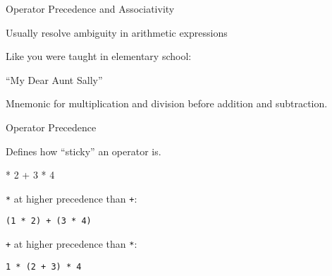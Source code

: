 \documentclass{plt}
\def\plus#1#2{node {\texttt{+}} child {#1} child {#2}}
\def\mult#1#2{node {\texttt{*}} child {#1} child {#2}}
\def\lit#1{node {#1}}
\begin{document}
\begin{frame}{Operator Precedence and Associativity}

Usually resolve ambiguity in arithmetic expressions

Like you were taught in elementary school:

``My Dear Aunt Sally''

Mnemonic for multiplication and division before addition and subtraction.

\end{frame}

\begin{frame}{Operator Precedence}

Defines how ``sticky'' an operator is.

\begin{center} * 2 + 3 * 4
\end{center}

\begin{minipage}{0.65\textwidth}
\texttt{*} at higher precedence than \texttt{+}:

\medskip

\texttt{(1 * 2) + (3 * 4)}
\end{minipage}

\begin{minipage}{0.65\textwidth}
\texttt{+} at higher precedence than \texttt{*}:

\medskip

\texttt{1 * (2 + 3) * 4}
\end{minipage}
\end{frame}
\end{document}
